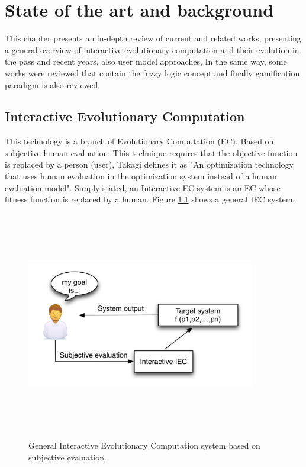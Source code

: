\chapter{State of the art and background} \label{}
This chapter presents an in-depth review of current and related works,
presenting a general overview of interactive evolutionary computation and their
evolution in the pass and recent years, also user model approaches, In the same
way, some works were reviewed that contain the fuzzy logic concept and finally
gamification paradigm is also reviewed.

\section{Interactive Evolutionary Computation}

This technology is a branch of Evolutionary Computation (EC). Based on
subjective human evaluation. This technique requires that the objective function
is replaced by a person (user), Takagi defines it as "An optimization technology
that uses human evaluation in the optimization system instead of a human
evaluation model"\cite{takagi1998application}. Simply stated, an Interactive EC
system is an EC whose fitness function is replaced by a human. Figure
\ref{fig:IEC} shows a general IEC system.

\begin{figure}
	\captionsetup{justification=centering,margin=2cm}
	\centering
	\setlength\fboxsep{0pt}
	\setlength\fboxrule{0.7pt}
	\includegraphics[width=10cm,height=10cm,keepaspectratio]{img/IECGeneral.png}
	\caption{ General Interactive Evolutionary Computation system based on subjective evaluation.}
	\label{fig:IEC}
\end{figure}

